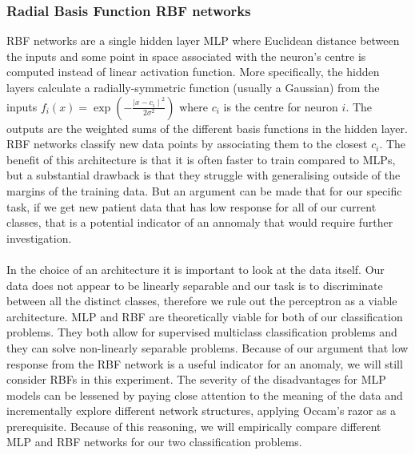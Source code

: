 \documentclass[11pt,a4paper]{article}
\begin{document}


\subsubsection{Radial Basis Function RBF networks}
RBF networks are a single hidden layer MLP where Euclidean distance between the inputs and some point in space associated with the neuron's centre is computed instead of linear activation function. More specifically, the hidden layers calculate a radially-symmetric function (usually a Gaussian) from the inputs \(f_i(x) = \exp \left(-\frac{{\mid x - c_i \mid}^2}{2 \sigma^2} \right) \) where \(c_i\) is the centre for neuron \(i\). The outputs are the weighted sums of the different basis functions in the hidden layer.
RBF networks classify new data points by associating them to the closest \(c_i\). The benefit of this architecture is that it is often faster to train compared to MLPs, but a substantial drawback is that they struggle with generalising outside of the margins of the training data. But an argument can be made that for our specific task, if we get new patient data that has low response for all of our current classes, that is a potential indicator of an annomaly that would require further investigation.

\paragraph{}
In the choice of an architecture it is important to look at the data itself. Our data does not appear to be linearly separable and our task is to discriminate between all the distinct classes, therefore we rule out the perceptron as a viable architecture.
MLP and RBF are theoretically viable for both of our classification problems. They both allow for supervised multiclass classification problems and they can solve non-linearly separable problems. Because of our argument that low response from the RBF network is a useful indicator for an anomaly, we will still consider RBFs in this experiment. The severity of the disadvantages for MLP models can be lessened by paying close attention to the meaning of the data and incrementally explore different network structures, applying Occam's razor as a prerequisite. Because of this reasoning, we will empirically compare different MLP and RBF networks for our two classification problems.
\end{document}
